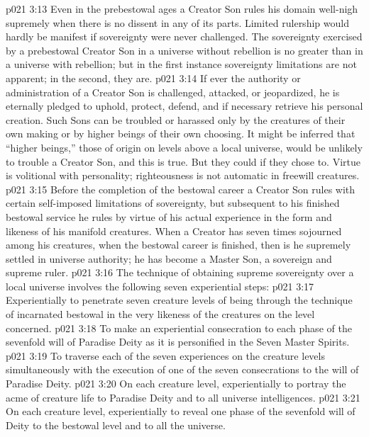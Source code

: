 \vs p021 3:13 Even in the prebestowal ages a Creator Son rules his domain well\hyp{}nigh supremely when there is no dissent in any of its parts. Limited rulership would hardly be manifest if sovereignty were never challenged. The sovereignty exercised by a prebestowal Creator Son in a universe without rebellion is no greater than in a universe with rebellion; but in the first instance sovereignty limitations are not apparent; in the second, they are.
\vs p021 3:14 If ever the authority or administration of a Creator Son is challenged, attacked, or jeopardized, he is eternally pledged to uphold, protect, defend, and if necessary retrieve his personal creation. Such Sons can be troubled or harassed only by the creatures of their own making or by higher beings of their own choosing. It might be inferred that “higher beings,” those of origin on levels above a local universe, would be unlikely to trouble a Creator Son, and this is true. But they could if they chose to. Virtue is volitional with personality; righteousness is not automatic in freewill creatures.
\vs p021 3:15 Before the completion of the bestowal career a Creator Son rules with certain self\hyp{}imposed limitations of sovereignty, but subsequent to his finished bestowal service he rules by virtue of his actual experience in the form and likeness of his manifold creatures. When a Creator has seven times sojourned among his creatures, when the bestowal career is finished, then is he supremely settled in universe authority; he has become a Master Son, a sovereign and supreme ruler.
\vs p021 3:16 \pc The technique of obtaining supreme sovereignty over a local universe involves the following seven experiential steps:
\vs p021 3:17 \bibnobreakspace Experientially to penetrate seven creature levels of being through the technique of incarnated bestowal in the very likeness of the creatures on the level concerned.
\vs p021 3:18 \bibnobreakspace To make an experiential consecration to each phase of the sevenfold will of Paradise Deity as it is personified in the Seven Master Spirits.
\vs p021 3:19 \bibnobreakspace To traverse each of the seven experiences on the creature levels simultaneously with the execution of one of the seven consecrations to the will of Paradise Deity.
\vs p021 3:20 \bibnobreakspace On each creature level, experientially to portray the acme of creature life to Paradise Deity and to all universe intelligences.
\vs p021 3:21 \bibnobreakspace On each creature level, experientially to reveal one phase of the sevenfold will of Deity to the bestowal level and to all the universe.
